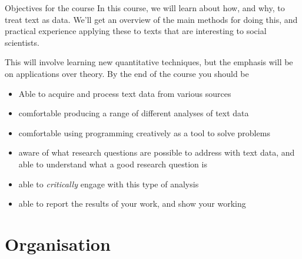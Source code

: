 \documentclass[
  10pt,
  ignorenonframetext,
  aspectratio=169]{beamer}
\providecommand{\tightlist}{%
  \setlength{\itemsep}{0pt}\setlength{\parskip}{0pt}}
\begin{document}
\begin{frame}{Objectives for the course}
\protect\hypertarget{objectives-for-the-course}{}
In this course, we will learn about how, and why, to treat text as data.
We'll get an overview of the main methods for doing this, and practical
experience applying these to texts that are interesting to social
scientists.

This will involve learning new quantitative techniques, but the emphasis
will be on applications over theory. By the end of the course you should
be

\begin{itemize}
\tightlist
\item
  Able to acquire and process text data from various sources
\item
  comfortable producing a range of different analyses of text data
\item
  comfortable using programming creatively as a tool to solve problems
\item
  aware of what research questions are possible to address with text
  data, and able to understand what a good research question is
\item
  able to \emph{critically} engage with this type of analysis
\item
  able to report the results of your work, and show your working
\end{itemize}
\end{frame}

\hypertarget{organisation}{%
\section{Organisation}\label{organisation}}
\end{document}
